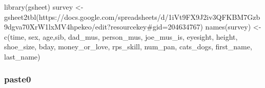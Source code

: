 \documentclass[
]{book}
\newenvironment{Shaded}{\begin{snugshade}}{\end{snugshade}}
\newcommand{\FunctionTok}[1]{\textcolor[rgb]{0.00,0.00,0.00}{#1}}
\newcommand{\NormalTok}[1]{#1}
\newcommand{\OtherTok}[1]{\textcolor[rgb]{0.56,0.35,0.01}{#1}}
\newcommand{\StringTok}[1]{\textcolor[rgb]{0.31,0.60,0.02}{#1}}
\begin{document}
\begin{Shaded}
\begin{Highlighting}[]
\FunctionTok{library}\NormalTok{(gsheet)}
\NormalTok{survey }\OtherTok{\textless{}{-}} \FunctionTok{gsheet2tbl}\NormalTok{(}\StringTok{\textquotesingle{}https://docs.google.com/spreadsheets/d/1iVt9FX9J2iv3QFKBM7Gzb9dgva70XrW1lxMV4hpekeo/edit?resourcekey\#gid=204634767\textquotesingle{}}\NormalTok{)}
\FunctionTok{names}\NormalTok{(survey) }\OtherTok{\textless{}{-}} \FunctionTok{c}\NormalTok{(}\StringTok{\textquotesingle{}time\textquotesingle{}}\NormalTok{, }\StringTok{\textquotesingle{}sex\textquotesingle{}}\NormalTok{, }\StringTok{\textquotesingle{}age\textquotesingle{}}\NormalTok{,}\StringTok{\textquotesingle{}sib\textquotesingle{}}\NormalTok{, }\StringTok{\textquotesingle{}dad\_mus\textquotesingle{}}\NormalTok{, }\StringTok{\textquotesingle{}person\_mus\textquotesingle{}}\NormalTok{, }\StringTok{\textquotesingle{}joe\_mus\_is\textquotesingle{}}\NormalTok{, }\StringTok{\textquotesingle{}eyesight\textquotesingle{}}\NormalTok{, }\StringTok{\textquotesingle{}height\textquotesingle{}}\NormalTok{, }\StringTok{\textquotesingle{}shoe\_size\textquotesingle{}}\NormalTok{, }\StringTok{\textquotesingle{}bday\textquotesingle{}}\NormalTok{, }\StringTok{\textquotesingle{}money\_or\_love\textquotesingle{}}\NormalTok{, }\StringTok{\textquotesingle{}rps\_skill\textquotesingle{}}\NormalTok{, }\StringTok{\textquotesingle{}num\_pan\textquotesingle{}}\NormalTok{, }\StringTok{\textquotesingle{}cats\_dogs\textquotesingle{}}\NormalTok{, }\StringTok{\textquotesingle{}first\_name\textquotesingle{}}\NormalTok{, }\StringTok{\textquotesingle{}last\_name\textquotesingle{}}\NormalTok{)}
\end{Highlighting}
\end{Shaded}

\hypertarget{paste0}{%
\subsubsection*{paste0}\label{paste0}}
\end{document}
